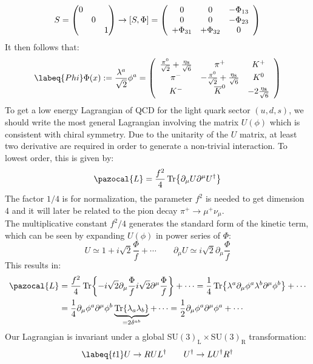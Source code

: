\documentclass[../main.tex]{subfiles}
\begin{document}
\[
S=\mqty(\dmat{0,0,1})\to[S,\Phi]=\left(\begin{array}{ccc}
    0 & 0 & -\Phi_{13} \\
    0 & 0 & -\Phi_{23} \\
    +\Phi_{31} & +\Phi_{32} & 0
\end{array}\right)
\]
It then follows that:
\begin{equation}
\labeq{Phi}
\Phi(x):=\frac{\lambda^a}{\sqrt{2}}\phi^a=\left(\begin{array}{ccc}
    \frac{\pi^0}{\sqrt{2}}+\frac{\eta_8}{\sqrt{6}} & \pi^+ & K^+ \\
    \pi^- & -\frac{\pi^0}{\sqrt{2}}+\frac{\eta_8}{\sqrt{6}} & K^0 \\
    K^- & \overline{K}^0 & -2\frac{\eta_8}{\sqrt{6}}
\end{array}\right)
\end{equation}
To get a low energy Lagrangian of QCD for the light quark sector $(u, d, s)$, we should write the most general Lagrangian involving the matrix $U(\phi)$ which is consistent with chiral symmetry. Due to the unitarity of the $U$ matrix, at least two derivative are required in order to generate a non-trivial interaction. To lowest order, this is given by:
\[
\pazocal{L}=\frac{f^2}{4}\Tr{\partial_\mu U\partial^\mu U^\dagger}
\]
The factor $1/4$ is for normalization, the parameter $f^2$ is needed to get dimension 4 and it will later be related to the pion decay $\pi^+\to\mu^+\nu_\mu$.\\
The multiplicative constant $f^2/4$ generates the standard form of the kinetic term, which can be seen by expanding $U(\phi)$ in power series of $\Phi$:
\[
U\simeq1+i\sqrt{2}\frac{\Phi}{f}+\cdots \qquad \partial_\mu U\simeq i\sqrt{2}\partial_\mu\frac{\Phi}{f}
\]
This results in:
\[
\begin{aligned}
\pazocal{L}&=\frac{f^2}{4}\Tr{-i\sqrt{2}\partial_\mu\frac{\Phi}{f}i\sqrt{2}\partial^\mu\frac{\Phi}{f}}+\cdots=\frac{1}{4}\Tr{\lambda^a\partial_\mu\phi^a\lambda^b\partial^\mu\phi^b}+\cdots\\
&=\frac{1}{4}\partial_\mu\phi^a\partial^\mu\phi^b\underbrace{\Tr{\lambda_a\lambda_b}}_{=2\delta^{ab}}+\cdots=\frac{1}{2}\partial_\mu\phi^a\partial^\mu\phi^a+\cdots
\end{aligned}
\]
Our Lagrangian is invariant under a global SU$(3)_{\text{L}}\times$SU$(3)_{\text{R}}$ transformation:
\begin{equation}
\labeq{t1}
U\to RUL^\dagger \qquad U^\dagger\to LU^\dagger R^\dagger
\end{equation}
\end{document}
